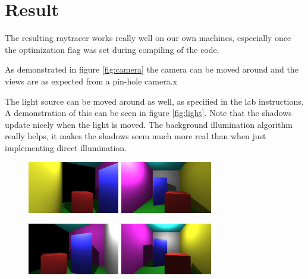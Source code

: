 \documentclass[a4paper]{article}
\begin{document}
\section{Result}
The resulting raytracer works really well on our own machines, especially once
the optimization flag was set during compiling of the code. 

As demonstrated in figure \ref{fig:camera} the camera can be moved around and
the views are as expected from a pin-hole camera.x

The light source can be moved around as well, as specified in the lab instructions. A
demonstration of this can be seen in figure \ref{fig:light}.
Note that the shadows update nicely when the light is moved.
The background illumination algorithm really helps, it makes the shadows seem much
more real than when just implementing direct illumination.

\begin{figure}[H]
    \centering
    \begin{minipage}{.5\textwidth}
        \centering
        \includegraphics[width=4cm]{720ani0.png}
    \end{minipage}%
    \begin{minipage}{.5\textwidth}
        \centering
        \includegraphics[width=4cm]{light0.png}
    \end{minipage}
\end{figure}

\begin{figure}[H]
    \centering
    \begin{minipage}{.5\textwidth}
        \centering
        \includegraphics[width=4cm]{720ani1.png}
    \end{minipage}%
    \begin{minipage}{.5\textwidth}
        \centering
        \includegraphics[width=4cm]{light1.png}
    \end{minipage}
\end{figure}
\end{document}
